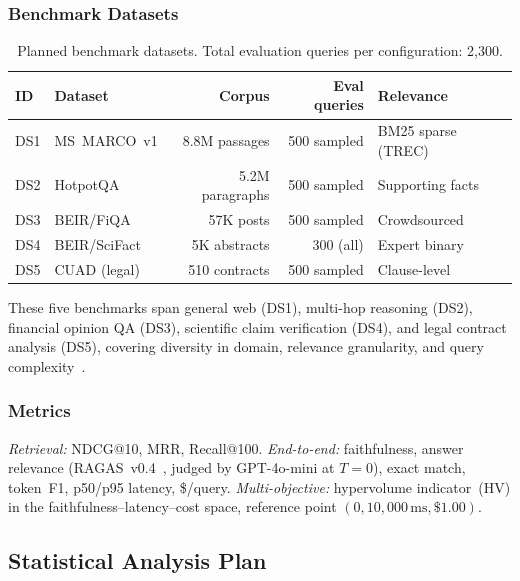 \subsubsection{Benchmark Datasets}

\begin{table}[h]
\centering
\footnotesize
\caption{Planned benchmark datasets.  Total evaluation queries per
  configuration: 2{,}300.}
\label{prereg:tab:benchmarks}
\begin{tabular}{@{}llrrl@{}}
\toprule
ID & Dataset & Corpus & Eval queries & Relevance \\
\midrule
DS1 & MS~MARCO~v1     & 8.8M passages       & 500 sampled & BM25 sparse (TREC) \\
DS2 & HotpotQA        & 5.2M paragraphs      & 500 sampled & Supporting facts \\
DS3 & BEIR/FiQA       & 57K posts            & 500 sampled & Crowdsourced \\
DS4 & BEIR/SciFact    & 5K abstracts         & 300 (all)   & Expert binary \\
DS5 & CUAD (legal)    & 510 contracts        & 500 sampled & Clause-level \\
\bottomrule
\end{tabular}
\end{table}

These five benchmarks span general web (DS1), multi-hop reasoning
(DS2), financial opinion QA (DS3), scientific claim verification
(DS4), and legal contract analysis (DS5), covering diversity in domain,
relevance granularity, and query
complexity~\citep{thakur2021beir}.

\subsubsection{Metrics}

\textit{Retrieval:} NDCG@10, MRR, Recall@100.
\textit{End-to-end:} faithfulness, answer relevance
(RAGAS~v0.4~\citep{es2023ragas}, judged by GPT-4o-mini at $T{=}0$),
exact match, token~F1, p50/p95 latency, \$/query.
\textit{Multi-objective:} hypervolume indicator~(HV) in the
faithfulness--latency--cost space, reference point
$(0, 10{,}000\,\text{ms}, \$1.00)$.

\subsection{Statistical Analysis Plan}
\label{prereg:sec:analysis}

